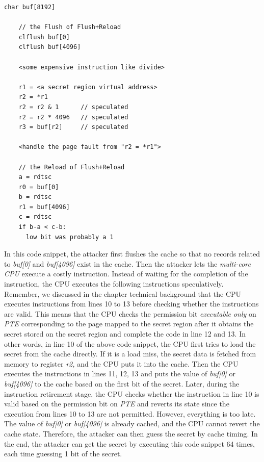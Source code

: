 \begin{lstlisting}[style=CStyle]
    char buf[8192]
  
    // the Flush of Flush+Reload
    clflush buf[0]
    clflush buf[4096]
  
    <some expensive instruction like divide>
  
    r1 = <a secret region virtual address>
    r2 = *r1
    r2 = r2 & 1      // speculated
    r2 = r2 * 4096   // speculated
    r3 = buf[r2]     // speculated
  
    <handle the page fault from "r2 = *r1">
  
    // the Reload of Flush+Reload
    a = rdtsc
    r0 = buf[0]
    b = rdtsc
    r1 = buf[4096]
    c = rdtsc
    if b-a < c-b:
      low bit was probably a 1
  \end{lstlisting}
  In this code snippet\cite{1}, the attacker first flushes the cache so that no 
  records related to \emph{buf[0]} and \emph{buf[4096]} exist in the cache. Then the 
  attacker lets the \emph{multi-core CPU} execute a costly instruction.  
  Instead of waiting for the completion of the instruction, the CPU 
  executes the following instructions speculatively. Remember, we discussed 
  in the chapter technical background that the CPU executes instructions 
  from lines 10 to 13 before checking whether the instructions are valid. 
  This means that the CPU checks the permission bit \emph{executable only} on  
  \emph{PTE} corresponding to the page mapped to the secret region after it 
  obtains the secret stored on the secret region and complete the 
  code in line 12 and 13.  In other words,  in line 10 of the above 
  code snippet,  the CPU first tries to load the secret from the 
  cache directly. If it is a load miss, the secret data is fetched 
  from memory to register \emph{r2,} and the CPU puts it into the cache. 
  Then the CPU executes the instructions in lines 11, 12, 13 and 
  puts the value of \emph{buf[0]} or \emph{buf[4096]} to the cache based on 
  the first bit of the secret.  Later, during the instruction 
  retirement stage, the CPU checks whether the instruction in 
  line 10 is valid based on the permission bit on \emph{PTE} and reverts 
  its state since the execution from lines 10 to 13 are not permitted. 
  However, everything is too late. The value of \emph{buf[0]} or \emph{buf[4096]} 
  is already cached, and the CPU cannot revert the cache state. 
  Therefore, the attacker can then guess the secret by cache timing\cite{11}. 
  In the end, the attacker can get the secret by executing this code 
  snippet 64 times, each time guessing 1 bit of the secret.

